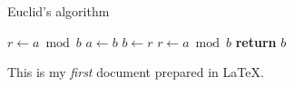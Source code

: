 \documentclass{article}
\begin{document}
\begin{algorithm}
\caption{Euclid’s algorithm}\label{euclid}
\begin{algorithmic}[1]
\State $r\gets a\bmod b$
\State $a\gets b$
\State $b\gets r$
\State $r\gets a\bmod b$
\EndWhile\label{euclidendwhile}
\State \textbf{return} $b$
\EndProcedure
\end{algorithmic}
\end{algorithm}


This is my \emph{first} document prepared in \LaTeX.
\end{document}
